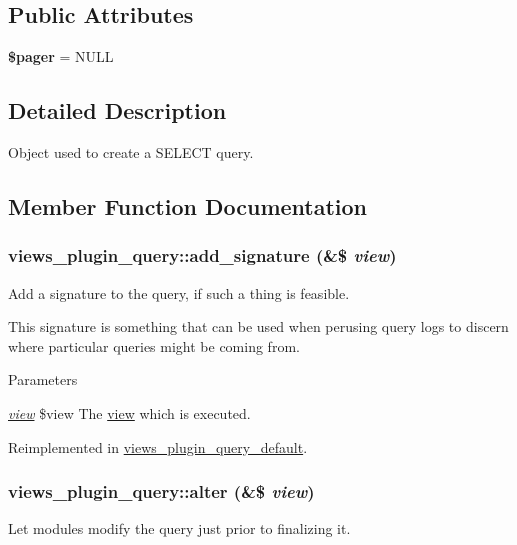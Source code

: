 \subsection*{Public Attributes}
\begin{DoxyCompactItemize}
\item 
\hypertarget{classviews__plugin__query_a51a47d320a4a39a6fc49a751a67bdda6}{
{\bfseries \$pager} = NULL}
\label{classviews__plugin__query_a51a47d320a4a39a6fc49a751a67bdda6}

\end{DoxyCompactItemize}


\subsection{Detailed Description}
Object used to create a SELECT query. 

\subsection{Member Function Documentation}
\hypertarget{classviews__plugin__query_ac6c76ccb108e97f5662bec62877894f4}{
\subsubsection[{add\_\-signature}]{\setlength{\rightskip}{0pt plus 5cm}views\_\-plugin\_\-query::add\_\-signature (\&\$ {\em view})}}
\label{classviews__plugin__query_ac6c76ccb108e97f5662bec62877894f4}
Add a signature to the query, if such a thing is feasible.

This signature is something that can be used when perusing query logs to discern where particular queries might be coming from.


\begin{DoxyParams}{Parameters}
\item[{\em \hyperlink{classview}{view}}]\$view The \hyperlink{classview}{view} which is executed. \end{DoxyParams}


Reimplemented in \hyperlink{classviews__plugin__query__default_a24253e8f12ec25b6a16413d6b5659547}{views\_\-plugin\_\-query\_\-default}.\hypertarget{classviews__plugin__query_a19995bd24c67d383d8f6393b19a1ebfe}{
\subsubsection[{alter}]{\setlength{\rightskip}{0pt plus 5cm}views\_\-plugin\_\-query::alter (\&\$ {\em view})}}
\label{classviews__plugin__query_a19995bd24c67d383d8f6393b19a1ebfe}
Let modules modify the query just prior to finalizing it.


